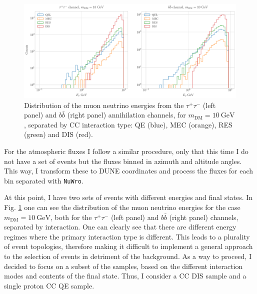 \begin{figure}[t]
	\centering
	\includegraphics[width=1\linewidth]{Images/DM_Analysis/solardm_nu_mu_interactions.pdf}
	\caption[Distribution of the muon neutrino energies from the $\tau^{+} \tau^{-}$ and $b\bar{b}$ annihilation channels.]{Distribution of the muon neutrino energies from the $\tau^{+} \tau^{-}$ (left panel) and $b\bar{b}$ (right panel) annihilation channels, for $m_{\mathrm{DM}} = 10 \ \mathrm{GeV}$, separated by CC interaction type: QE (blue), MEC (orange), RES (green) and DIS (red).}
	\label{fig:solardm_nu_mu_interactions}
\end{figure}

For the atmospheric fluxes I follow a similar procedure, only that this time I do not have a set of events but the fluxes binned in azimuth and altitude angles. This way, I transform these to DUNE coordinates and process the fluxes for each bin separated with \texttt{NuWro}.

At this point, I have two sets of events with different energies and final states. In Fig. \ref{fig:solardm_nu_mu_interactions} one can see the distribution of the muon neutrino energies for the case $m_{\mathrm{DM}} = 10 \ \mathrm{GeV}$, both for the $\tau^{+} \tau^{-}$ (left panel) and $b\bar{b}$ (right panel) channels, separated by interaction. One can clearly see that there are different energy regimes where the primary interaction type is different. This leads to a plurality of event topologies, therefore making it difficult to implement a general approach to the selection of events in detriment of the background. As a way to proceed, I decided to focus on a subset of the samples, based on the different interaction modes and contents of the final state. Thus, I consider a CC DIS sample and a single proton CC QE sample.

